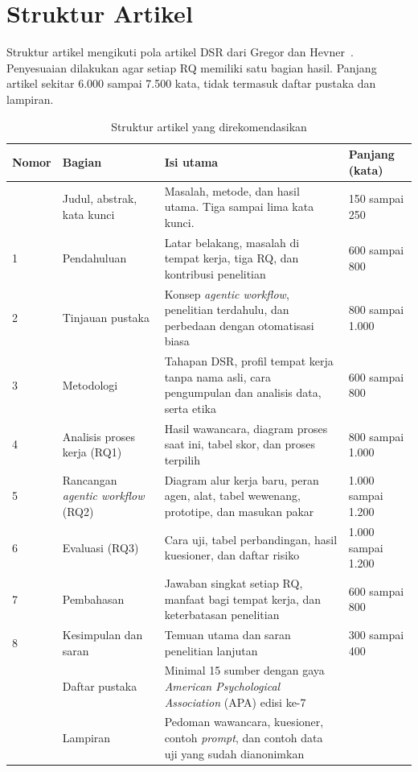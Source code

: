 \documentclass[11pt, a4paper]{article}
\newcommand{\eng}[1]{\textit{#1}}
\begin{document}
\section{Struktur Artikel}

Struktur artikel mengikuti pola artikel DSR dari Gregor dan Hevner~\cite{gregor2013}.
Penyesuaian dilakukan agar setiap RQ memiliki satu bagian hasil.
Panjang artikel sekitar 6.000 sampai 7.500 kata, tidak termasuk daftar pustaka dan lampiran.

\begin{table}[htbp]
  \centering
  \caption{Struktur artikel yang direkomendasikan}
  \label{tab:struktur}
  \small
  \begin{tabularx}{\linewidth}{@{}L{1.3cm}L{3.6cm}YL{3.1cm}@{}}
    \toprule
    \textbf{Nomor} & \textbf{Bagian} & \textbf{Isi utama} & \textbf{Panjang (kata)} \\
    \midrule
       & Judul, abstrak, kata kunci & Masalah, metode, dan hasil utama. Tiga sampai lima kata kunci. & 150 sampai 250 \\
    1  & Pendahuluan & Latar belakang, masalah di tempat kerja, tiga RQ, dan kontribusi penelitian & 600 sampai 800 \\
    2  & Tinjauan pustaka & Konsep \eng{agentic workflow}, penelitian terdahulu, dan perbedaan dengan otomatisasi biasa & 800 sampai 1.000 \\
    3  & Metodologi & Tahapan DSR, profil tempat kerja tanpa nama asli, cara pengumpulan dan analisis data, serta etika & 600 sampai 800 \\
    4  & Analisis proses kerja (RQ1) & Hasil wawancara, diagram proses saat ini, tabel skor, dan proses terpilih & 800 sampai 1.000 \\
    5  & Rancangan \eng{agentic workflow} (RQ2) & Diagram alur kerja baru, peran agen, alat, tabel wewenang, prototipe, dan masukan pakar & 1.000 sampai 1.200 \\
    6  & Evaluasi (RQ3) & Cara uji, tabel perbandingan, hasil kuesioner, dan daftar risiko & 1.000 sampai 1.200 \\
    7  & Pembahasan & Jawaban singkat setiap RQ, manfaat bagi tempat kerja, dan keterbatasan penelitian & 600 sampai 800 \\
    8  & Kesimpulan dan saran & Temuan utama dan saran penelitian lanjutan & 300 sampai 400 \\
       & Daftar pustaka & Minimal 15 sumber dengan gaya \eng{American Psychological Association} (APA) edisi ke-7 & \\
       & Lampiran & Pedoman wawancara, kuesioner, contoh \eng{prompt}, dan contoh data uji yang sudah dianonimkan & \\
    \bottomrule
  \end{tabularx}
\end{table}
\end{document}
